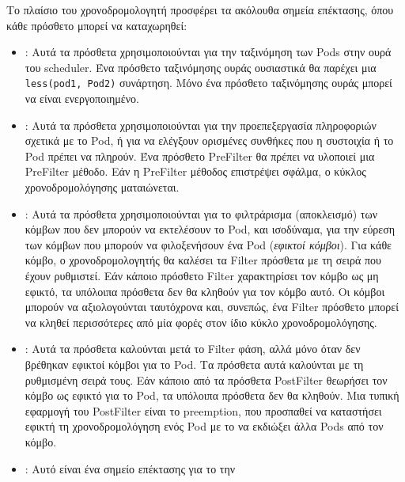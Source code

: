 Το πλαίσιο του χρονοδρομολογητή προσφέρει τα ακόλουθα σημεία επέκτασης, όπου
κάθε πρόσθετο μπορεί να καταχωρηθεί:

\begin{itemize}
      \item
            \textbf{}: Αυτά τα πρόσθετα χρησιμοποιούνται για την
            ταξινόμηση των Pods στην ουρά του scheduler. Ένα πρόσθετο
            ταξινόμησης ουράς ουσιαστικά θα παρέχει μια \texttt{less(pod1,
            Pod2)} συνάρτηση. Μόνο ένα πρόσθετο ταξινόμησης ουράς μπορεί να
            είναι ενεργοποιημένο.
      \item
            \textbf{}: Αυτά τα πρόσθετα χρησιμοποιούνται για την
            προεπεξεργασία πληροφοριών σχετικά με το Pod, ή για να ελέγξουν
            ορισμένες συνθήκες που η συστοιχία ή το Pod πρέπει να πληρούν. Ένα
            πρόσθετο PreFilter θα πρέπει να υλοποιεί μια PreFilter μέθοδο. Εάν η
            PreFilter μέθοδος επιστρέψει σφάλμα, ο κύκλος χρονοδρομολόγησης
            ματαιώνεται.
      \item
            \textbf{}: Αυτά τα πρόσθετα χρησιμοποιούνται για το
            φιλτράρισμα (αποκλεισμό) των κόμβων που δεν μπορούν να εκτελέσουν το
            Pod, και ισοδύναμα, για την εύρεση των κόμβων που μπορούν να
            φιλοξενήσουν ένα Pod (\textit{εφικτοί κόμβοι}). Για κάθε κόμβο, ο
            χρονοδρομολογητής θα καλέσει τα Filter πρόσθετα με τη σειρά που
            έχουν ρυθμιστεί. Εάν κάποιο πρόσθετο Filter χαρακτηρίσει τον κόμβο
            ως μη εφικτό, τα υπόλοιπα πρόσθετα δεν θα κληθούν για τον κόμβο
            αυτό. Οι κόμβοι μπορούν να αξιολογούνται ταυτόχρονα και, συνεπώς,
            ένα Filter πρόσθετο μπορεί να κληθεί περισσότερες από μία φορές στον
            ίδιο κύκλο χρονοδρομολόγησης.
      \item
            \textbf{}: Αυτά τα πρόσθετα καλούνται μετά το Filter
            φάση, αλλά μόνο όταν δεν βρέθηκαν εφικτοί κόμβοι για το Pod. Τα
            πρόσθετα αυτά καλούνται με τη ρυθμισμένη σειρά τους. Εάν κάποιο από
            τα πρόσθετα PostFilter θεωρήσει τον κόμβο ως εφικτό για το Pod, τα
            υπόλοιπα πρόσθετα δεν θα κληθούν. Μια τυπική εφαρμογή του PostFilter
            είναι το preemption, που προσπαθεί να καταστήσει εφικτή τη
            χρονοδρομολόγηση ενός Pod  με το να εκδιώξει άλλα Pods από τον
            κόμβο.
      \item
            \textbf{}: Αυτό είναι ένα σημείο επέκτασης για το την

\end{itemize}
